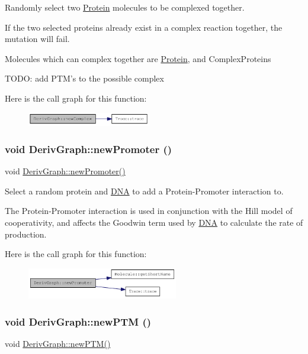 Randomly select two \hyperlink{classProtein}{Protein} molecules to be complexed together.

If the two selected proteins already exist in a complex reaction together, the mutation will fail.

Molecules which can complex together are \hyperlink{classProtein}{Protein}, and ComplexProteins

TODO: add PTM's to the possible complex 

Here is the call graph for this function:\nopagebreak
\begin{figure}[H]
\begin{center}
\leavevmode
\includegraphics[width=153pt]{classDerivGraph_a4be722e989002430ca7c363dce500638_cgraph}
\end{center}
\end{figure}
\hypertarget{classDerivGraph_aa55a36103c33d4f1bd57de797bcd45cb}{
\subsubsection[{newPromoter}]{\setlength{\rightskip}{0pt plus 5cm}void DerivGraph::newPromoter ()}}
\label{classDerivGraph_aa55a36103c33d4f1bd57de797bcd45cb}
void \hyperlink{classDerivGraph_aa55a36103c33d4f1bd57de797bcd45cb}{DerivGraph::newPromoter()}

Select a random protein and \hyperlink{classDNA}{DNA} to add a Protein-\/Promoter interaction to.

The Protein-\/Promoter interaction is used in conjunction with the Hill model of cooperativity, and affects the Goodwin term used by \hyperlink{classDNA}{DNA} to calculate the rate of production. 

Here is the call graph for this function:\nopagebreak
\begin{figure}[H]
\begin{center}
\leavevmode
\includegraphics[width=187pt]{classDerivGraph_aa55a36103c33d4f1bd57de797bcd45cb_cgraph}
\end{center}
\end{figure}
\hypertarget{classDerivGraph_a83937a5c3ed427ebaad2bf23260c0352}{
\subsubsection[{newPTM}]{\setlength{\rightskip}{0pt plus 5cm}void DerivGraph::newPTM ()}}
\label{classDerivGraph_a83937a5c3ed427ebaad2bf23260c0352}
void \hyperlink{classDerivGraph_a83937a5c3ed427ebaad2bf23260c0352}{DerivGraph::newPTM()}


